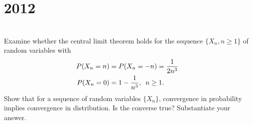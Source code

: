\section*{2012}
\vspace{-.5cm}
\hrulefill \smallskip\\
 Examine whether the central limit theorem holds for the sequence $\{ X_n, n \geq 1\}$ of random variables with
\[ \begin{aligned}
   P (X_n = n) &= P(X_n= -n) = \dfrac{1}{2n^3} \\
P(X_n =0) &= 1 - \frac{1}{n^3}, \enskip n\geq1. 
\end{aligned} \]
 Show that for a sequence of random variables $\{X_n\}$, convergence in probability implies convergence in distribution. Is the converse true? Substantiate your answer.